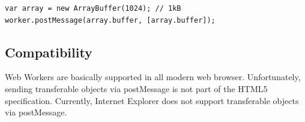 \begin{lstlisting}[frame=single,basicstyle=\footnotesize]
var array = new ArrayBuffer(1024); // 1kB
worker.postMessage(array.buffer, [array.buffer]);
\end{lstlisting}


\subsection{Compatibility}

Web Workers are basically supported in all modern web browser. Unfortunately, sending transferable objects via postMessage is not part of the HTML5 specification. Currently, Internet Explorer does not support transferable objects via postMessage.
